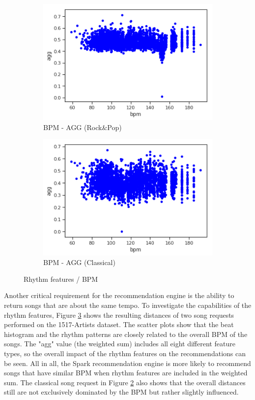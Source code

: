 \begin{figure}[htbp]
{{			\begin{subfigure}{.495\textwidth}
				\centering			
				\includegraphics[scale=0.5]{Images/SparkFeat/bpm_agg_hip.png}	
				\caption{BPM - AGG (Rock\&Pop)}
				\label{fig:arbpm}
			\end{subfigure}		
			\begin{subfigure}{.495\textwidth}
				\centering			
				\includegraphics[scale=0.5]{Images/SparkFeat/bpm_agg_clas.png}	
				\caption{BPM - AGG (Classical)}
				\label{fig:acbpm}
			\end{subfigure}%
	}}
	\caption{Rhythm features / BPM}
	\label{fig:rhythmfeat}
\end{figure}
\FloatBarrier

\noindent Another critical requirement for the recommendation engine is the ability to return songs that are about the same tempo. To investigate the capabilities of the rhythm features, Figure \ref{fig:rhythmfeat} shows the resulting distances of two song requests performed on the 1517-Artists dataset.
\noindent The scatter plots show that the beat histogram and the rhythm patterns are closely related to the overall BPM of the songs. The "agg" value (the weighted sum) includes all eight different feature types, so the overall impact of the rhythm features on the recommendations can be seen. All in all, the Spark recommendation engine is more likely to recommend songs that have similar BPM when rhythm features are included in the weighted sum. The classical song request in Figure \ref{fig:acbpm} also shows that the overall distances still are not exclusively dominated by the BPM but rather slightly influenced. 

